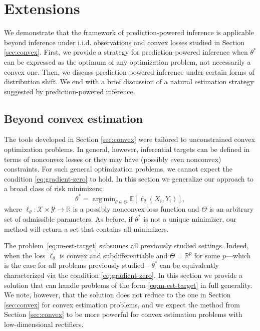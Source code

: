 \documentclass[10pt]{article}
\def\R{\mathbb{R}}
\def\E{\mathbb{E}}
\newcommand{\Y}{\mathcal{Y}}
\newcommand{\X}{\mathcal{X}}
\DeclareMathOperator*{\argmin}{arg\,min}
\begin{document}
\section{Extensions}
\label{sec:methods-details}

We demonstrate that the framework of prediction-powered inference is applicable beyond inference under i.i.d. observations and convex losses studied in Section \ref{sec:convex}. First, we provide a strategy for prediction-powered inference when $\theta^*$ can be expressed as the optimum of any optimization problem, not necessarily a convex one. Then, we discuss prediction-powered inference under certain forms of distribution shift. We end with a brief discussion of a natural estimation strategy suggested by prediction-powered inference.

\subsection{Beyond convex estimation}
\label{sec:nonconvex}

The tools developed in Section \ref{sec:convex} were tailored to unconstrained convex optimization problems. In general, however, inferential targets can be defined in terms of nonconvex losses or they may have (possibly even nonconvex) constraints. For such general optimization problems, we cannot expect the condition \eqref{eq:gradient-zero} to hold. In this section we generalize our approach to a broad class of risk minimizers:
\begin{equation}
\label{eq:m-est-target}
\theta^* = \argmin_{\theta\in\Theta} \E [\ell_\theta(X_i,Y_i)],
\end{equation}
where $\ell_\theta:\X\times\Y\rightarrow\R$ is a possibly nonconvex loss function and $\Theta$ is an arbitrary set of admissible parameters. As before, if $\theta^*$ is not a unique minimizer, our method will return a set that contains all minimizers.


The problem~\eqref{eq:m-est-target} subsumes all previously studied settings. Indeed, when the loss $\ell_\theta$ is convex and subdifferentiable and $\Theta = \R^p$ for some $p$---which is the case for all problems previously studied---$\theta^*$ can be equivalently characterized via the condition \eqref{eq:gradient-zero}. In this section we provide a solution that can handle problems of the form \eqref{eq:m-est-target} in full generality. We note, however, that the solution does not reduce to the one in Section \ref{sec:convex} for convex estimation problems, and we expect the method from Section \ref{sec:convex} to be more powerful for convex estimation problems with low-dimensional rectifiers.
\end{document}
